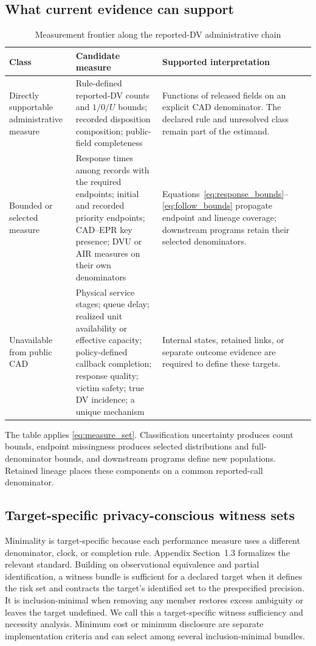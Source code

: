 \documentclass[11pt]{article}
\begin{document}
\subsection{What current evidence can support}

\begin{table}[H]
\centering
\caption{Measurement frontier along the reported-DV administrative chain}
\label{tab:dv_admissibility}
\begin{tabularx}{\textwidth}{@{}>{\raggedright\arraybackslash}p{2.45cm} X X@{}}
\toprule
Class & Candidate measure & Supported interpretation \\
\midrule
Directly supportable administrative measure &
Rule-defined reported-DV counts and $1/0/U$ bounds; recorded disposition composition; public-field completeness &
Functions of released fields on an explicit CAD denominator. The declared rule and unresolved class remain part of the estimand. \\
\addlinespace
Bounded or selected measure &
Response times among records with the required endpoints; initial and recorded priority endpoints; CAD--EPR key presence; DVU or AIR measures on their own denominators &
Equations~\ref{eq:response_bounds}--\ref{eq:follow_bounds} propagate endpoint and lineage coverage; downstream programs retain their selected denominators. \\
\addlinespace
Unavailable from public CAD &
Physical service stages; queue delay; realized unit availability or effective capacity; policy-defined callback completion; response quality; victim safety; true DV incidence; a unique mechanism &
Internal states, retained links, or separate outcome evidence are required to define these targets. \\
\bottomrule
\end{tabularx}
\end{table}

The table applies \cref{eq:measure_set}. Classification uncertainty produces count bounds, endpoint missingness produces selected distributions and full-denominator bounds, and downstream programs define new populations. Retained lineage places these components on a common reported-call denominator.

\subsection{Target-specific privacy-conscious witness sets}

Minimality is target-specific because each performance measure uses a different denominator, clock, or completion rule. Appendix Section~1.3 formalizes the relevant standard. Building on observational equivalence and partial identification, a witness bundle is sufficient for a declared target when it defines the risk set and contracts the target's identified set to the prespecified precision. It is inclusion-minimal when removing any member restores excess ambiguity or leaves the target undefined. We call this a target-specific witness sufficiency and necessity analysis. Minimum cost or minimum disclosure are separate implementation criteria and can select among several inclusion-minimal bundles.
\end{document}
